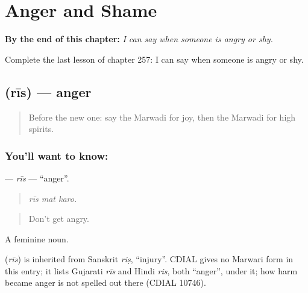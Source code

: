 
\chapter{Anger and Shame}
\label{ch:mw-anger-and-shame}

\begin{chapteropening}
\textbf{By the end of this chapter:} \emph{I can say when someone is angry or shy.}

Complete the last lesson of chapter 257: I can say when someone is angry or shy.
\end{chapteropening}

\section[\texorpdfstring{\mw{रीस} (rīs)}{रीस (rīs)}]{ (rīs) — anger}

\label{lesson:MW-C257-ris}



\begin{quote}
Before the new one: say the Marwadi for joy, then the Marwadi for high spirits.
\end{quote}

\subsection*{You'll want to know: }
\textbf{} — \emph{rīs} — \textquotedblleft{}anger\textquotedblright{}.

\begin{quote}
  
\end{quote}

\begin{quote}
\emph{rīs mat karo.}
\end{quote}

\begin{quote}
Don't get angry.
\end{quote}

A feminine noun.

\begin{cousinweb}
\textbf{} (\emph{rīs}) is inherited from Sanskrit \emph{riṣ}, \textquotedblleft{}injury\textquotedblright{}. CDIAL gives no Marwari form in this entry; it lists Gujarati \emph{rīs} and Hindi \emph{ris}, both \textquotedblleft{}anger\textquotedblright{}, under it; how harm became anger is not spelled out there (CDIAL 10746).
\end{cousinweb}

